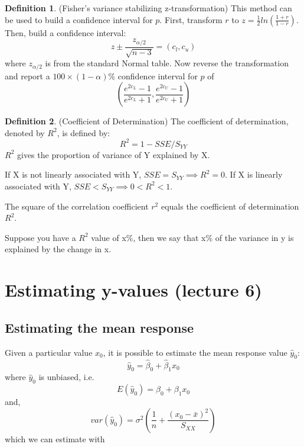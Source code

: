\documentclass[12pt]{article}
\theoremstyle{definition}
\newtheorem{definition}{Definition}[section]
\theoremstyle{remark}
\begin{document}
\begin{definition}(Fisher's variance stabilizing z-transformation)
    This method can be used to build a confidence interval for $p$. First, transform $r$ to 
    $z=\frac{1}{2}ln(\frac{1+r}{1-r})$. Then, build a confidence interval:
    \begin{equation}
        z \pm \frac{z_{\alpha/2}}{\sqrt{n-3}}=(c_l, c_u)
    \end{equation}
    where $z_{\alpha/2}$ is from the standard Normal table. Now reverse the transformation and 
    report a $100 \times (1-\alpha)\%$ confidence interval for $p$ of
    \begin{equation}
        \left( \frac{e^{2c_L}-1}{e^{2c_L}+1},\frac{e^{2c_U}-1}{e^{2c_U}+1} \right)
    \end{equation}
\end{definition}

\begin{definition}(Coefficient of Determination)
    The coefficient of determination, denoted by $R^2$, is defined by:
    \begin{equation}
        R^2=1-SSE/S_{YY}
    \end{equation}
    $R^2$ gives the proportion of variance of Y explained by X.
\end{definition}
\begin{note}
    If X is not linearly associated with Y, $SSE=S_{YY} \implies R^2 =0$. If X is linearly associated 
    with Y, $SSE<S_{YY} \implies 0<R^2<1$.
\end{note}
\begin{note}
    The square of the correlation coefficient $r^2$ equals the coefficient of determination $R^2$.
\end{note}
\begin{example}
    Suppose you have a $R^2$ value of x\%, then we say that x\% of the variance in y is explained by the change in x.
\end{example}

\section{Estimating y-values (lecture 6)}
\subsection{Estimating the mean response}
    Given a particular value $x_0$, it is possible to estimate the mean response value $\hat{y}_0$:
    $$\hat{y}_0 = \hat{\beta}_0+ \hat{\beta}_1 x_0$$
    where $\hat{y}_0$ is unbiased, i.e. 
    $$E(\hat{y}_0) = \beta_0+ \beta_1 x_0$$
    and, 
    $$var(\hat{y}_0) = \sigma^2 \left(\frac{1}{n} + \frac{(x_0 - \bar{x})^2}{S_{XX}} \right) $$
    which we can estimate with
\end{document}
